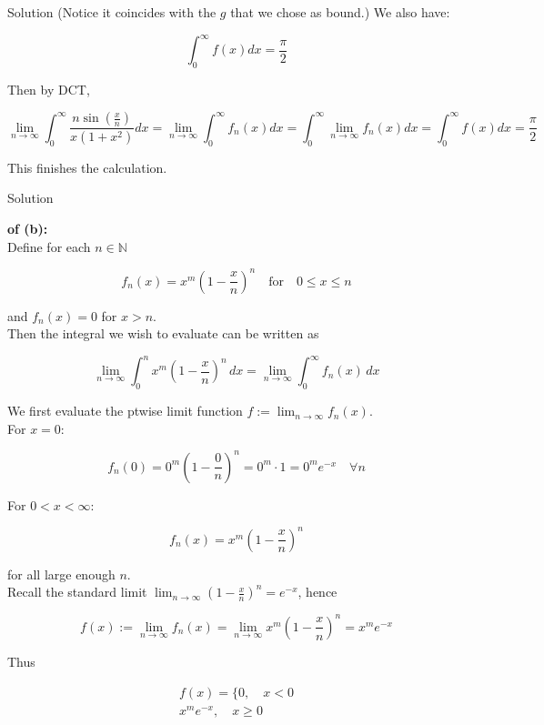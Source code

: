 \begin{qlsolution}{Solution}
(Notice it coincides with the \(g\) that we chose as bound.) We also have:

\[\int_{0}^{\infty}f(x) dx = \frac{\pi}{2}\]

Then by DCT,

\[\lim\limits_{n\rightarrow\infty}\int_{0}^{\infty}\frac{n\sin\left( \frac{x}{n} \right)}{x(1 + x^{2})} dx = \lim\limits_{n\rightarrow\infty}\int_{0}^{\infty}f_{n}(x) dx = \int_{0}^{\infty}\lim\limits_{n\rightarrow\infty}f_{n}(x) dx = \int_{0}^{\infty}f(x) dx = \frac{\pi}{2}\]

This finishes the calculation.

\end{qlsolution}

\begin{qlsolution}{Solution}

\textbf{of (b):}\\
Define for each \(n \in \mathbb{N}\)

\[f_{n}(x) = x^{m}\left( {1 - \frac{x}{n}} \right)^{n}\quad\text{for}\quad 0 \leq x \leq n\]

and \(f_{n}(x) = 0\) for \(x > n\).\\
Then the integral we wish to evaluate can be written as

\[\lim\limits_{n\rightarrow\infty}\int_{0}^{n}x^{m}\left( {1 - \frac{x}{n}} \right)^{n}\, dx = \lim\limits_{n\rightarrow\infty}\int_{0}^{\infty}f_{n}(x)\, dx\]

We first evaluate the ptwise limit function \(f := \lim_{n\rightarrow\infty}f_{n}(x)\).\\
For \(x = 0\):

\[f_{n}(0) = 0^{m}\left( {1 - \frac{0}{n}} \right)^{n} = 0^{m} \cdot 1 = 0^{m}e^{- x}\quad\forall n\]

For \(0 < x < \infty\):

\[f_{n}(x) = x^{m}\left( {1 - \frac{x}{n}} \right)^{n}\]

for all large enough \(n\).\\
Recall the standard limit \(\lim_{n\rightarrow\infty}\left( {1 - \frac{x}{n}} \right)^{n} = e^{- x}\), hence

\[f(x) := \lim\limits_{n\rightarrow\infty}f_{n}(x) = \lim\limits_{n\rightarrow\infty}x^{m}\left( {1 - \frac{x}{n}} \right)^{n} = x^{m}e^{- x}\]

Thus

\[\begin{matrix}
{f(x) = \{ 0,\quad x < 0} \\
{x^{m}e^{- x},\quad x \geq 0}
\end{matrix}\]


\end{qlsolution}
